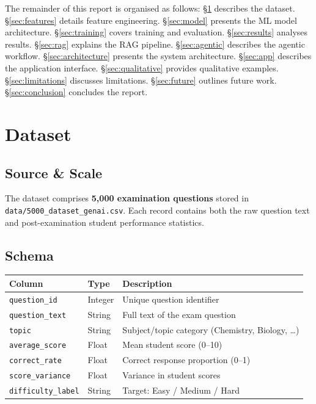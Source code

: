\documentclass[12pt, a4paper, twoside]{article}
\newcommand{\code}[1]{\texttt{#1}}
\newcommand{\bref}[1]{\hyperref[#1]{\S\ref*{#1}}}
\begin{document}
The remainder of this report is organised as follows:
\bref{sec:dataset} describes the dataset.
\bref{sec:features} details feature engineering.
\bref{sec:model} presents the ML model architecture.
\bref{sec:training} covers training and evaluation.
\bref{sec:results} analyses results.
\bref{sec:rag} explains the RAG pipeline.
\bref{sec:agentic} describes the agentic workflow.
\bref{sec:architecture} presents the system architecture.
\bref{sec:app} describes the application interface.
\bref{sec:qualitative} provides qualitative examples.
\bref{sec:limitations} discusses limitations.
\bref{sec:future} outlines future work.
\bref{sec:conclusion} concludes the report.

\section{Dataset}\label{sec:dataset}

\subsection{Source \& Scale}

The dataset comprises \textbf{5{,}000 examination questions} stored in
\code{data/5000\_dataset\_genai.csv}. Each record contains both the
raw question text and post-examination student performance statistics.

\subsection{Schema}

\begin{center}
\renewcommand{\arraystretch}{1.3}
\begin{tabularx}{\textwidth}{l l X}
    \toprule
    \textbf{Column} & \textbf{Type} & \textbf{Description} \\
    \midrule
    \code{question\_id}       & Integer & Unique question identifier \\
    \code{question\_text}     & String  & Full text of the exam question \\
    \code{topic}              & String  & Subject/topic category
                                          (Chemistry, Biology, \ldots) \\
    \code{average\_score}     & Float   & Mean student score (0--10) \\
    \code{correct\_rate}      & Float   & Correct response proportion (0--1) \\
    \code{score\_variance}    & Float   & Variance in student scores \\
    \code{difficulty\_label}  & String  & Target: Easy / Medium / Hard \\
    \bottomrule
\end{tabularx}
\end{center}
\end{document}
